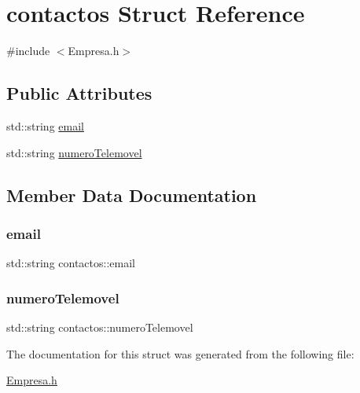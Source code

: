 \hypertarget{structcontactos}{}\section{contactos Struct Reference}
\label{structcontactos}


{\ttfamily \#include $<$Empresa.\+h$>$}

\subsection*{Public Attributes}
\begin{DoxyCompactItemize}
\item 
std\+::string \hyperlink{structcontactos_a86c1ad3bcc23dbb8bf7bb37ae0976242}{email}
\item 
std\+::string \hyperlink{structcontactos_a09e1d4029e1eb91fc9ec76e4b4b6d48a}{numero\+Telemovel}
\end{DoxyCompactItemize}


\subsection{Member Data Documentation}
\mbox{\label{structcontactos_a86c1ad3bcc23dbb8bf7bb37ae0976242}} 
\subsubsection{\texorpdfstring{email}{email}}
{\footnotesize\ttfamily std\+::string contactos\+::email}

\mbox{\label{structcontactos_a09e1d4029e1eb91fc9ec76e4b4b6d48a}} 
\subsubsection{\texorpdfstring{numero\+Telemovel}{numeroTelemovel}}
{\footnotesize\ttfamily std\+::string contactos\+::numero\+Telemovel}



The documentation for this struct was generated from the following file\+:\begin{DoxyCompactItemize}
\item 
\hyperlink{Empresa_8h}{Empresa.\+h}\end{DoxyCompactItemize}
